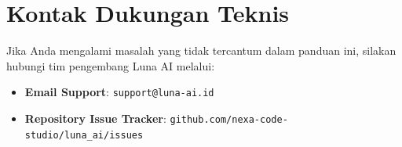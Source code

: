 \section{Kontak Dukungan Teknis}
Jika Anda mengalami masalah yang tidak tercantum dalam panduan ini, silakan hubungi tim pengembang Luna AI melalui:
\begin{itemize}
    \item \textbf{Email Support}: \texttt{support@luna-ai.id}
    \item \textbf{Repository Issue Tracker}: \texttt{github.com/nexa-code-studio/luna\_ai/issues}
\end{itemize}
